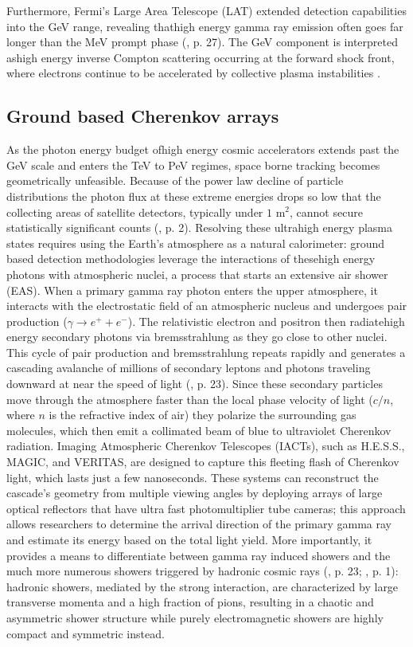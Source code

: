 \documentclass{aa} %
\begin{document}
Furthermore, Fermi's Large Area Telescope (LAT) extended detection capabilities into the GeV range, revealing thathigh energy gamma ray emission often goes far longer than the MeV prompt phase (\citet{KumarandZhang2015}, p. 27). The GeV component is interpreted ashigh energy inverse Compton scattering occurring at the forward shock front, where electrons continue to be accelerated by collective plasma instabilities \citep{Brainerd1999}. 

\subsection{Ground based Cherenkov arrays}
As the photon energy budget ofhigh energy cosmic accelerators extends past the GeV scale and enters the TeV to PeV regimes, space borne tracking becomes geometrically unfeasible. Because of the power law decline of particle distributions the photon flux at these extreme energies drops so low that the collecting areas of satellite detectors, typically under $1\text{ m}^2$, cannot secure statistically significant counts (\citet{KumarandZhang2015}, p. 2). Resolving these ultrahigh energy plasma states requires using the Earth's atmosphere as a natural calorimeter: ground based detection methodologies leverage the interactions of thesehigh energy photons with atmospheric nuclei, a process that starts an extensive air shower (EAS).
When a primary gamma ray photon enters the upper atmosphere, it interacts with the electrostatic field of an atmospheric nucleus and undergoes pair production ($\gamma \rightarrow e^+ + e^-$). The relativistic electron and positron then radiatehigh energy secondary photons via bremsstrahlung as they go close to other nuclei. This cycle of pair production and bremsstrahlung repeats rapidly and generates a cascading avalanche of millions of secondary leptons and photons traveling downward at near the speed of light (\citet{Addazietal2021}, p. 23). Since these secondary particles move through the atmosphere faster than the local phase velocity of light ($c/n$, where $n$ is the refractive index of air) they polarize the surrounding gas molecules, which then emit a collimated beam of blue to ultraviolet Cherenkov radiation.
Imaging Atmospheric Cherenkov Telescopes (IACTs), such as H.E.S.S., MAGIC, and VERITAS, are designed to capture this fleeting flash of Cherenkov light, which lasts just a few nanoseconds. These systems can reconstruct the cascade's geometry from multiple viewing angles by deploying arrays of large optical reflectors that have ultra fast photomultiplier tube cameras; this approach allows researchers to determine the arrival direction of the primary gamma ray and estimate its energy based on the total light yield. More importantly, it provides a means to differentiate between gamma ray induced showers and the much more numerous showers triggered by hadronic cosmic rays (\citet{Addazietal2021}, p. 23; \citet{Boettcheretal1996}, p. 1): hadronic showers, mediated by the strong interaction, are characterized by large transverse momenta and a high fraction of pions, resulting in a chaotic and asymmetric shower structure while purely electromagnetic showers are highly compact and symmetric instead.
\end{document}
